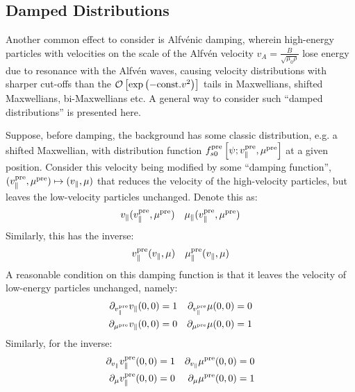 \subsection{Damped Distributions}\label{damped distributions}
    Another common effect to consider is Alfvénic damping, wherein high-energy particles with velocities on the scale of the Alfvén velocity $v_{A} = \frac{B}{\sqrt{\mu_{0}\rho}}$ lose energy due to resonance with the Alfvén waves, causing velocity distributions with sharper cut-offs than the $\mathcal{O}\left[\exp\left(- {\rm const.}v^{2}\right)\right]$ tails in Maxwellians, shifted Maxwellians, bi-Maxwellians etc. A general way to consider such ``damped distributions'' is presented here.
    
    Suppose, before damping, the background has some classic distribution, e.g. a shifted Maxwellian, with distribution function $f_{s0}^{\rm pre}\left[\psi; v_{\parallel}^{\rm pre}, \mu^{\rm pre}\right]$ at a given position. Consider this velocity being modified by some ``damping function'', $(v_{\parallel}^{\rm pre}, \mu^{\rm pre}) \mapsto (v_{\parallel}, \mu)$ that reduces the velocity of the high-velocity particles, but leaves the low-velocity particles unchanged. Denote this as:
    \begin{align}
        v_{\parallel}(v_{\parallel}^{\rm pre}, \mu^{\rm pre})  &&
        \mu_{\parallel}(v_{\parallel}^{\rm pre}, \mu^{\rm pre})
    \end{align}
    Similarly, this has the inverse:
    \begin{align}
        v_{\parallel}^{\rm pre}(v_{\parallel}, \mu)  &&
        \mu_{\parallel}^{\rm pre}(v_{\parallel}, \mu)
    \end{align}
    A reasonable condition on this damping function is that it leaves the velocity of low-energy particles unchanged, namely:
    \begin{align}
        \partial_{v_{\parallel}^{\rm pre}}v_{\parallel}(0, 0)  =  1  &&
        \partial_{v_{\parallel}^{\rm pre}}\mu(0, 0)  =  0  \\
        \partial_{\mu^{\rm pre}}v_{\parallel}(0, 0)  =  0  &&
        \partial_{\mu^{\rm pre}}\mu(0, 0)  =  1
    \end{align}
    Similarly, for the inverse:
    \begin{align}
        \partial_{v_{\parallel}}v_{\parallel}^{\rm pre}(0, 0)  =  1  &&
        \partial_{v_{\parallel}}\mu^{\rm pre}(0, 0)  =  0  \\
        \partial_{\mu}v_{\parallel}^{\rm pre}(0, 0)  =  0  &&
        \partial_{\mu}\mu^{\rm pre}(0, 0)  =  1
    \end{align}
